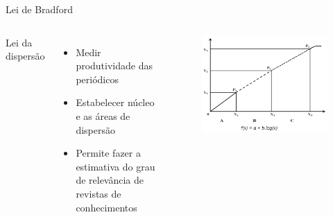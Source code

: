 \begin{frame}{Lei de Bradford}

	\begin{columns}
		Lei da dispersão
		\begin{itemize}
			\item Medir produtividade das periódicos
			\item Estabelecer núcleo e as áreas de dispersão 
			\item Permite fazer a estimativa do grau de relevância de revistas de conhecimentos
		\end{itemize}
		\begin{figure}[hb]
			\includegraphics[width=1\textwidth]{figures/bradford.png}
		\end{figure}
	\end{columns}

\end{frame}

